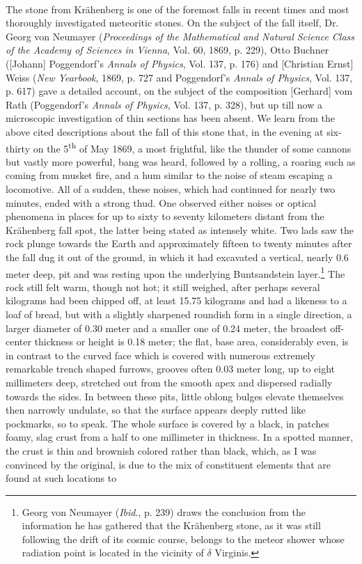 \documentclass[a4paper, 12pt, oneside]{article}
\begin{document}
\paragraph*{}
The stone from Krähenberg is one of the foremost falls in recent times and most thoroughly investigated meteoritic stones. On the subject of the fall itself, Dr. Georg von Neumayer (\emph{Proceedings of the Mathematical and Natural Science Class of the Academy of Sciences in Vienna}, Vol. 60, 1869, p. 229), Otto Buchner ([Johann] Poggendorf's \emph{Annals of Physics}, Vol. 137, p. 176) and [Christian Ernst] Weiss (\emph{New Yearbook}, 1869, p. 727 and Poggendorf's \emph{Annals of Physics}, Vol. 137, p. 617) gave a detailed account, on the subject of the composition [Gerhard] vom Rath (Poggendorf's \emph{Annals of Physics}, Vol. 137, p. 328), but up till now a microscopic investigation of thin sections has been absent. We learn from the above cited descriptions about the fall of this stone that, in the evening at six-thirty on the 5\textsuperscript{th} of May 1869, a most frightful, like the thunder of some cannons but vastly more powerful, bang was heard, followed by a rolling, a roaring such as coming from musket fire, and a hum similar to the noise of steam escaping a locomotive. All of a sudden, these noises, which had continued for nearly two minutes, ended with a strong thud. One observed either noises or optical phenomena in places for up to sixty to seventy kilometers distant from the Krähenberg fall spot, the latter being stated as intensely white. Two lads saw the rock plunge towards the Earth and approximately fifteen to twenty minutes after the fall dug it out of the ground, in which it had excavated a vertical, nearly 0.6 meter deep, pit and was resting upon the underlying Buntsandstein layer.\footnote{Georg von Neumayer (\emph{Ibid}., p. 239) draws the conclusion from the information he has gathered that the Krähenberg stone, as it was still following the drift of its cosmic course, belongs to the meteor shower whose radiation point is located in the vicinity of $\delta$ Virginis.} The rock still felt warm, though not hot; it still weighed, after perhaps several kilograms had been chipped off, at least 15.75 kilograms and had a likeness to a loaf of bread, but with a slightly sharpened roundish form in a single direction, a larger diameter of 0.30 meter and a smaller one of 0.24 meter, the broadest off-center thickness or height is 0.18 meter; the flat, base area, considerably even, is in contrast to the curved face which is covered with numerous extremely remarkable trench shaped furrows, grooves often 0.03 meter long, up to eight millimeters deep, stretched out from the smooth apex and dispersed radially towards the sides.  In between these pits, little oblong bulges elevate themselves then narrowly undulate, so that the surface appears deeply rutted like pockmarks, so to speak. The whole surface is covered by a black, in patches foamy, slag crust from a half to one millimeter in thickness. In a spotted manner, the crust is thin and brownish colored rather than black, which, as I was convinced by the original, is due to the mix of constituent elements that are found at such locations to 
\end{document}
